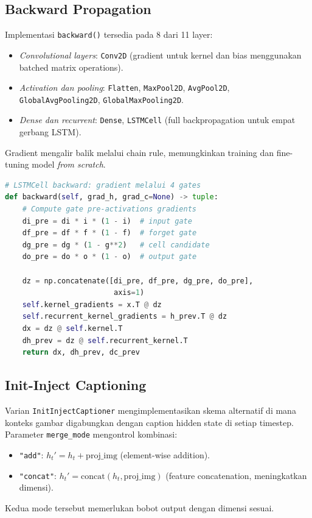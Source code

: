 \subsection{Backward Propagation}
Implementasi \texttt{backward()} tersedia pada 8 dari 11 layer:
\begin{itemize}
    \item \textit{Convolutional layers}: \texttt{Conv2D} (gradient untuk kernel dan bias menggunakan batched matrix operations).
    \item \textit{Activation dan pooling}: \texttt{Flatten}, \texttt{MaxPool2D}, \texttt{AvgPool2D}, \texttt{GlobalAvgPooling2D}, \texttt{GlobalMaxPooling2D}.
    \item \textit{Dense dan recurrent}: \texttt{Dense}, \texttt{LSTMCell} (full backpropagation untuk empat gerbang LSTM).
\end{itemize}
Gradient mengalir balik melalui chain rule, memungkinkan training dan fine-tuning model \textit{from scratch}.

\begin{lstlisting}[language=Python, basicstyle=\ttfamily\small]
# LSTMCell backward: gradient melalui 4 gates
def backward(self, grad_h, grad_c=None) -> tuple:
    # Compute gate pre-activations gradients
    di_pre = di * i * (1 - i)  # input gate
    df_pre = df * f * (1 - f)  # forget gate
    dg_pre = dg * (1 - g**2)   # cell candidate
    do_pre = do * o * (1 - o)  # output gate
    
    dz = np.concatenate([di_pre, df_pre, dg_pre, do_pre], 
                         axis=1)
    self.kernel_gradients = x.T @ dz
    self.recurrent_kernel_gradients = h_prev.T @ dz
    dx = dz @ self.kernel.T
    dh_prev = dz @ self.recurrent_kernel.T
    return dx, dh_prev, dc_prev
\end{lstlisting}

\subsection{Init-Inject Captioning}
Varian \texttt{InitInjectCaptioner} mengimplementasikan skema alternatif di mana konteks gambar digabungkan dengan caption hidden state di setiap timestep. Parameter \texttt{merge\_mode} mengontrol kombinasi:
\begin{itemize}
    \item \texttt{"add"}: $h_t' = h_t + \text{proj\_img}$ (element-wise addition).
    \item \texttt{"concat"}: $h_t' = \text{concat}(h_t, \text{proj\_img})$ (feature concatenation, meningkatkan dimensi).
\end{itemize}
Kedua mode tersebut memerlukan bobot output dengan dimensi sesuai.

